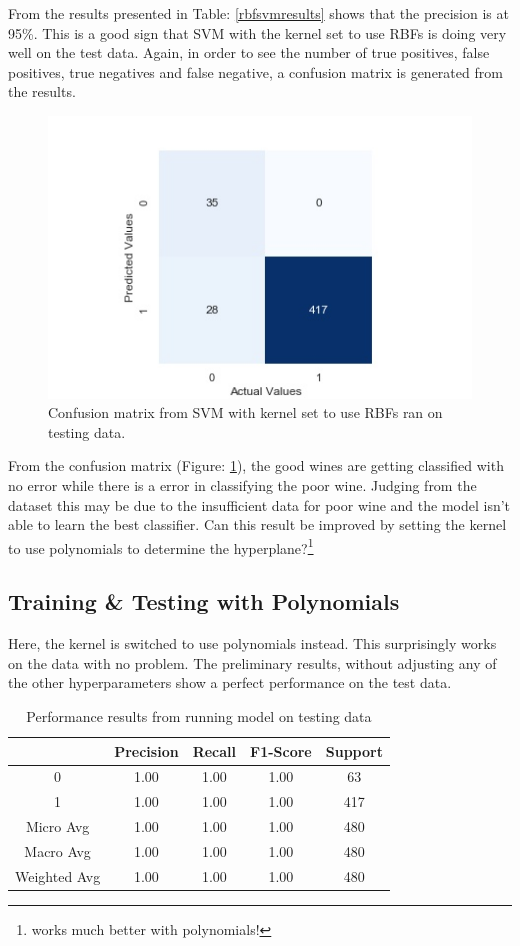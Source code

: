 \documentclass[a4paper,titlepage]{article}
\begin{document}
	\noindent From the results presented in Table: \ref{rbfsvmresults} shows that the precision is at 95\%. This is a good sign that SVM with the kernel set to use RBFs is doing very well on the test data. Again, in order to see the number of true positives, false positives, true negatives and false negative, a confusion matrix is generated from the results.\\
	\begin{figure}[H]
		\centering
		\includegraphics[scale=0.6]{img/twoclass_svmrbf.jpg}
		\caption{Confusion matrix from SVM with kernel set to use RBFs ran on testing data.}
		\label{svmrbfconfmat}
	\end{figure}
	From the confusion matrix (Figure: \ref{svmrbfconfmat}), the good wines are getting classified with no error while there is a error in classifying the poor wine. Judging from the dataset this may be due to the insufficient data for poor wine and the model isn't able to learn the best classifier. Can this result be improved by setting the kernel to use polynomials to determine the hyperplane?\footnote{works much better with polynomials!}
	\subsection{Training \& Testing with Polynomials}
	Here, the kernel is switched to use polynomials instead. This surprisingly works on the data with no problem. The preliminary results, without adjusting any of the other hyperparameters show a perfect performance on the test data. 
	\begin{table}[h]
		\centering
		\begin{tabular}{||c||c c c c||}
			\hline
			& \textbf{Precision} & \textbf{Recall} & \textbf{F1-Score} & \textbf{Support}\\
			\hline
			\hline
			0 & 1.00 & 1.00 & 1.00 & 63\\
			1 & 1.00 & 1.00 & 1.00 & 417\\
			\hline
			\hline
			Micro Avg & 1.00 & 1.00 & 1.00 & 480\\
			Macro Avg & 1.00 & 1.00 & 1.00 & 480\\
			Weighted Avg & 1.00 & 1.00 & 1.00 & 480\\
			\hline
		\end{tabular}
		\caption{Performance results from running model on testing data}
	\end{table}
\end{document}
